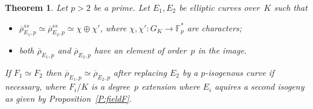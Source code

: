 \documentclass[12pt]{amsart}
\newcommand{\F}{\mathbb{F}}
\newcommand{\rhobar}{{\overline{\rho}}}
\numberwithin{equation}{section}
\newtheorem{theorem}{Theorem}[section]
\theoremstyle{definition}
\theoremstyle{remark}
\begin{document}
\begin{theorem} 
Let $p > 2$ be a prime. Let $E_1, E_2$ be elliptic curves 
over~$K$ such that 
\begin{itemize}
 \item[(i)] $\rhobar_{E_1,p}^{ss} \simeq \rhobar_{E_2,p}^{ss} \simeq \chi \oplus \chi'$,  where $\chi, \chi' : G_K \to \F_p^*$ are characters;
 \item[(ii)] both $\rhobar_{E_1,p}$ and $\rhobar_{E_2,p}$ have an element of
 order~$p$ in the image.
\end{itemize}
If $F_1 \simeq F_2$ then $\rhobar_{E_1,p} \simeq \rhobar_{E_2,p}$ 
after replacing $E_2$ by a $p$-isogenous curve if necessary, 
where $F_i/K$ is a degree~$p$ extension where $E_i$ aquires a second isogeny
as given by Proposition~\ref{P:fieldF}.


\end{theorem}
\end{document}
